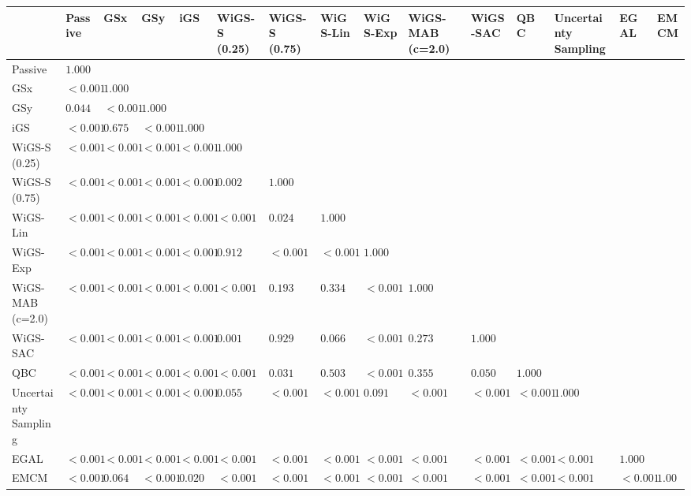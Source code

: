 \begin{tabular}{lllllllllllllll}
\toprule
 & Passive & GSx & GSy & iGS & WiGS-S (0.25) & WiGS-S (0.75) & WiGS-Lin & WiGS-Exp & WiGS-MAB (c=2.0) & WiGS-SAC & QBC & Uncertainty Sampling & EGAL & EMCM \\
\midrule
Passive & $1.000$ &  &  &  &  &  &  &  &  &  &  &  &  &  \\
GSx & $<0.001$ & $1.000$ &  &  &  &  &  &  &  &  &  &  &  &  \\
GSy & $0.044$ & $<0.001$ & $1.000$ &  &  &  &  &  &  &  &  &  &  &  \\
iGS & $<0.001$ & $0.675$ & $<0.001$ & $1.000$ &  &  &  &  &  &  &  &  &  &  \\
WiGS-S (0.25) & $<0.001$ & $<0.001$ & $<0.001$ & $<0.001$ & $1.000$ &  &  &  &  &  &  &  &  &  \\
WiGS-S (0.75) & $<0.001$ & $<0.001$ & $<0.001$ & $<0.001$ & $0.002$ & $1.000$ &  &  &  &  &  &  &  &  \\
WiGS-Lin & $<0.001$ & $<0.001$ & $<0.001$ & $<0.001$ & $<0.001$ & $0.024$ & $1.000$ &  &  &  &  &  &  &  \\
WiGS-Exp & $<0.001$ & $<0.001$ & $<0.001$ & $<0.001$ & $0.912$ & $<0.001$ & $<0.001$ & $1.000$ &  &  &  &  &  &  \\
WiGS-MAB (c=2.0) & $<0.001$ & $<0.001$ & $<0.001$ & $<0.001$ & $<0.001$ & $0.193$ & $0.334$ & $<0.001$ & $1.000$ &  &  &  &  &  \\
WiGS-SAC & $<0.001$ & $<0.001$ & $<0.001$ & $<0.001$ & $0.001$ & $0.929$ & $0.066$ & $<0.001$ & $0.273$ & $1.000$ &  &  &  &  \\
QBC & $<0.001$ & $<0.001$ & $<0.001$ & $<0.001$ & $<0.001$ & $0.031$ & $0.503$ & $<0.001$ & $0.355$ & $0.050$ & $1.000$ &  &  &  \\
Uncertainty Sampling & $<0.001$ & $<0.001$ & $<0.001$ & $<0.001$ & $0.055$ & $<0.001$ & $<0.001$ & $0.091$ & $<0.001$ & $<0.001$ & $<0.001$ & $1.000$ &  &  \\
EGAL & $<0.001$ & $<0.001$ & $<0.001$ & $<0.001$ & $<0.001$ & $<0.001$ & $<0.001$ & $<0.001$ & $<0.001$ & $<0.001$ & $<0.001$ & $<0.001$ & $1.000$ &  \\
EMCM & $<0.001$ & $0.064$ & $<0.001$ & $0.020$ & $<0.001$ & $<0.001$ & $<0.001$ & $<0.001$ & $<0.001$ & $<0.001$ & $<0.001$ & $<0.001$ & $<0.001$ & $1.000$ \\
\bottomrule
\end{tabular}
